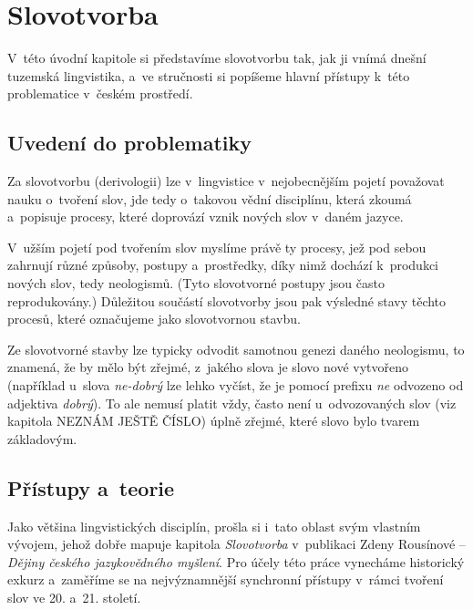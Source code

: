\hypertarget{slovotvorba}{%
\chapter{Slovotvorba}\label{slovotvorba}}

V~této úvodní kapitole si představíme slovotvorbu tak, jak ji vnímá
dnešní tuzemská lingvistika, a~ve stručnosti si popíšeme hlavní přístupy
k~této problematice v~českém prostředí.

\hypertarget{uvedenuxed-do-problematiky}{%
\section{Uvedení do problematiky}\label{uvedenuxed-do-problematiky}}

Za slovotvorbu (derivologii) lze v~lingvistice v~nejobecnějším pojetí
považovat nauku o~tvoření slov, jde tedy o~takovou vědní disciplínu,
která zkoumá a~popisuje procesy, které doprovází vznik nových slov
v~daném jazyce.

V~užším pojetí pod tvořením slov myslíme právě ty procesy, jež pod sebou
zahrnují různé způsoby, postupy a~prostředky, díky nimž dochází
k~produkci nových slov, tedy neologismů. (Tyto slovotvorné postupy jsou
často reprodukovány.) Důležitou součástí slovotvorby jsou pak výsledné
stavy těchto procesů, které označujeme jako slovotvornou stavbu.

Ze slovotvorné stavby lze typicky odvodit samotnou genezi daného
neologismu, to znamená, že by mělo být zřejmé, z~jakého slova je slovo
nové vytvořeno (například u~slova \emph{ne-dobrý} lze lehko vyčíst, že
je pomocí prefixu \emph{ne} odvozeno od adjektiva \emph{dobrý}). To ale
nemusí platit vždy, často není u~odvozovaných slov (viz kapitola NEZNÁM
JEŠTĚ ČÍSLO) úplně zřejmé, které slovo bylo tvarem základovým.

\hypertarget{pux159uxedstupy-a-teorie}{%
\section{Přístupy a~teorie}\label{pux159uxedstupy-a-teorie}}

Jako většina lingvistických disciplín, prošla si i~tato oblast svým
vlastním vývojem, jehož dobře mapuje kapitola \emph{Slovotvorba}
v~publikaci Zdeny Rousínové -- \emph{Dějiny českého jazykovědného
myšlení}. Pro účely této práce vynecháme historický exkurz a~zaměříme se
na nejvýznamnější synchronní přístupy v~rámci tvoření slov ve 20. a~21.
století.


